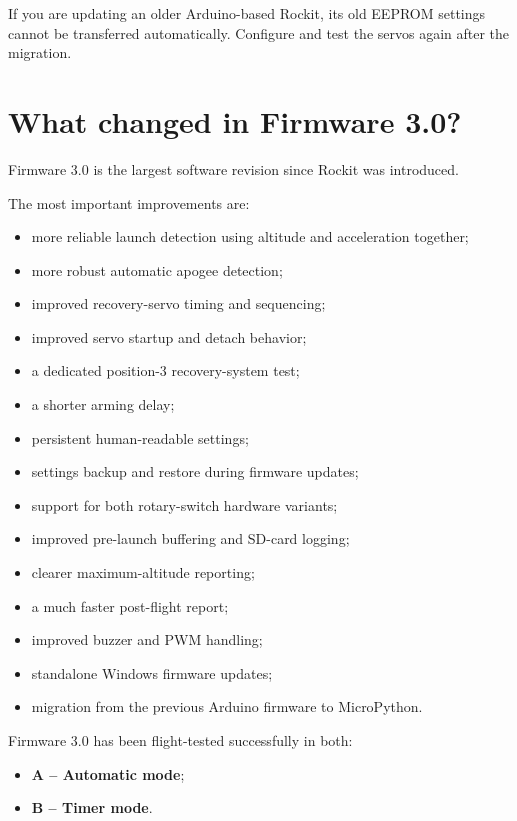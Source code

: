 \documentclass[11pt,a4paper]{article}
\begin{document}
\begin{importantbox}
If you are updating an older Arduino-based Rockit, its old EEPROM settings cannot be transferred automatically. Configure and test the servos again after the migration.
\end{importantbox}

\section{What changed in Firmware 3.0?}

Firmware 3.0 is the largest software revision since Rockit was introduced.

The most important improvements are:

\begin{itemize}
    \item more reliable launch detection using altitude and acceleration together;
    \item more robust automatic apogee detection;
    \item improved recovery-servo timing and sequencing;
    \item improved servo startup and detach behavior;
    \item a dedicated position-3 recovery-system test;
    \item a shorter arming delay;
    \item persistent human-readable settings;
    \item settings backup and restore during firmware updates;
    \item support for both rotary-switch hardware variants;
    \item improved pre-launch buffering and SD-card logging;
    \item clearer maximum-altitude reporting;
    \item a much faster post-flight report;
    \item improved buzzer and PWM handling;
    \item standalone Windows firmware updates;
    \item migration from the previous Arduino firmware to MicroPython.
\end{itemize}

Firmware 3.0 has been flight-tested successfully in both:

\begin{itemize}
    \item \textbf{A -- Automatic mode};
    \item \textbf{B -- Timer mode}.
\end{itemize}
\end{document}
